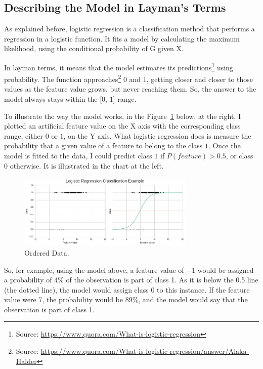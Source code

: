 \documentclass[a4paper]{article}
\begin{document}
\subsection{Describing the Model in Layman’s Terms}
As explained before, logistic regression is a classification method that performs a regression in a logistic function. It fits a model by calculating the maximum likelihood, using the conditional probability of G given X. 

In layman terms, it means that the model estimates its predictions\footnote{Source: \url{https://www.quora.com/What-is-logistic-regression}} using probability. The function approaches\footnote{Source: \url{https://www.quora.com/What-is-logistic-regression/answer/Alaka-Halder}} $0$ and $1$, getting closer and closer to those values as the feature value grows, but never reaching them. So, the answer to the model always stays within the [$0$, $1$] range. 

To illustrate the way the model works, in the Figure~\ref{fig:logitreg} below,  at the right, I plotted an artificial feature value on the X axis with the corresponding class range, either $0$ or $1$, on the Y axis. What logistic regression does is measure the probability that a given value of a feature to belong to the class $1$. Once the model is fitted to the data,  I could predict class $1$ if $P(feature) > 0.5$, or class $0$ otherwise. It is illustrated in the chart at the left.

\begin{figure}[ht]
\centering
\includegraphics[width=0.75\textwidth]{figures/logitref.png}
\caption{\label{fig:logitreg}Ordered Data.}
\end{figure}

So, for example, using the model above, a feature value of $-1$ would be assigned a probability of 4\% of the observation is part of class 1. As it is below the 0.5 line (the dotted line), the model would assign class 0 to this instance. If the feature value were 7, the probability would be 89\%, and the model would say that the observation is part of class 1.
\end{document}
